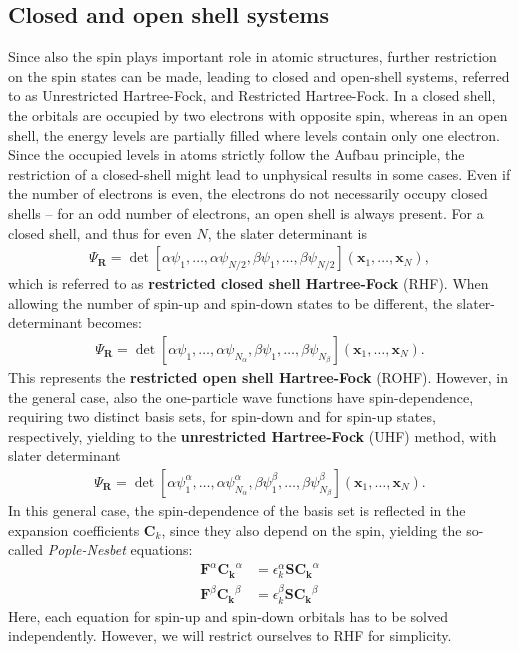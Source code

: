 \documentclass[twoside,        %
			   12pt,			%
               BCOR10mm,       %
               ngerman,english  %
               ]{scrartcl}
\begin{document}
\subsection{Closed and open shell systems}    
Since also the spin plays important role in atomic structures, further restriction on the spin states can be made, leading to closed and open-shell systems, referred to as Unrestricted Hartree-Fock, and Restricted Hartree-Fock. In a closed shell, the orbitals are occupied by two electrons with opposite spin, whereas in an open shell, the energy levels are partially filled where levels contain only one electron. Since the occupied levels in atoms strictly follow the Aufbau principle, the restriction of a closed-shell might lead to unphysical results in some cases. Even if the number of electrons is even, the electrons do not necessarily occupy closed shells -- for an odd number of electrons, an open shell is always present.
For a closed shell, and thus for even $N$, the slater determinant is
\begin{align*}
\Psi_\textbf{R} = \det \left[\alpha \psi_1, \dots, \alpha\psi_{N/2}, \beta \psi_1, \dots, \beta\psi_{N/2} \right] (\mathbf{x}_1, \dots, \mathbf{x}_N) , 
\end{align*} which is referred to as \textbf{restricted closed shell Hartree-Fock} (RHF).
When allowing the number of spin-up and spin-down states to be different, the slater-determinant becomes:
\begin{align*}
\Psi_\textbf{R} = \det \left[\alpha \psi_1, \dots, \alpha\psi_{N_\alpha}, \beta \psi_1, \dots, \beta\psi_{N_\beta} \right] (\mathbf{x}_1, \dots, \mathbf{x}_N).
\end{align*} This represents the \textbf{restricted open shell Hartree-Fock} (ROHF).
However, in the general case, also the one-particle wave functions have spin-dependence, requiring two distinct basis sets, for spin-down and for spin-up states, respectively, yielding to the \textbf{unrestricted Hartree-Fock} (UHF) method, with slater determinant
\begin{align*}
\Psi_\textbf{R} = \det \left[\alpha \psi_1^\alpha, \dots, \alpha\psi_{N_\alpha}^\alpha, \beta \psi_1^\beta, \dots, \beta\psi_{N_\beta}^\beta \right] (\mathbf{x}_1, \dots, \mathbf{x}_N).
\end{align*}
In this general case, the spin-dependence of the basis set is reflected in the expansion coefficients $\mathbf{C}_k$, since they also depend on the spin, yielding the so-called \emph{Pople-Nesbet} equations:
\begin{align*}
\mathbf{F}^\alpha \mathbf{C_k}^\alpha &= \epsilon_k^\alpha \mathbf{S} \mathbf{C_k}^\alpha \\
\mathbf{F}^\beta \mathbf{C_k}^\beta &= \epsilon_k^\beta \mathbf{S} \mathbf{C_k}^\beta
\end{align*}
Here, each equation for spin-up and spin-down orbitals has to be solved independently. However, we will restrict ourselves to RHF for simplicity.
\end{document}
